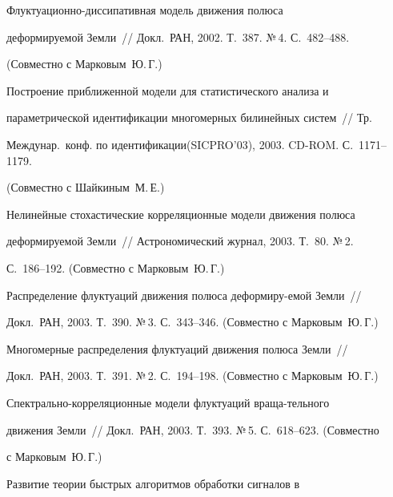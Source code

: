  Флуктуационно-диссипативная модель движения полюса


деформируемой Земли~// Докл.\ РАН, 2002. Т.~387. №\,4. С.~482--488.


(Совместно с Марковым~Ю.\,Г.)










 Построение приближенной модели для статистического анализа и


параметрической идентификации многомерных билинейных сис\-тем~// Тр.\


Междунар.\ конф. по идентификации\linebreak (SICPRO'03), 2003. CD-ROM. С.~1171--1179.


(Совместно с Шайкиным~М.\,Е.)





 Нелинейные стохастические корреляционные модели движения полюса


деформируемой Земли~// Астрономический журнал, 2003. Т.~80. №\,2.


С.~186--192. (Совместно с Марковым~Ю.\,Г.)





 Распределение флуктуаций движения полюса дефор\-ми\-ру-\linebreak емой Зем\-ли~//


Докл.\ РАН, 2003. Т.~390. №\,3. С.~343--346. (Совместно с Марковым~Ю.\,Г.)





 Многомерные распределения флуктуаций движения полюса Земли~//


Докл.\ РАН, 2003. Т.~391. №\,2. С.~194--198. (Совместно с Марковым~Ю.\,Г.)





 Спектрально-корреляционные модели флуктуаций враща-\linebreak тельного


движения Земли~// Докл.\ РАН, 2003. Т.~393. №\,5. С.~618--623. (Совместно


с Марковым~Ю.\,Г.)





 Развитие теории быстрых алгоритмов обработки сигналов в


